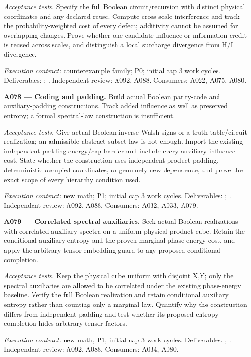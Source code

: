 \documentclass[11pt]{article}
\begin{document}
\emph{Acceptance tests.} Specify the full Boolean circuit/recursion with distinct physical coordinates and any declared reuse. Compute cross-scale interference and track the probability-weighted cost of every defect; additivity cannot be assumed for overlapping changes. Prove whether one candidate influence or information credit is reused across scales, and distinguish a local surcharge divergence from H/I divergence.

{\small\emph{Execution contract:} counterexample family; P0; initial cap 3 work cycles. Deliverables: ; . Independent review: A092, A088. Consumers: A022, A075, A080.}

\textbf{A078 --- Coding and padding.} Build actual Boolean parity-code and auxiliary-padding constructions. Track added influence as well as preserved entropy; a formal spectral-law construction is insufficient.

\emph{Acceptance tests.} Give actual Boolean inverse Walsh signs or a truth-table/circuit realization; an admissible abstract subset law is not enough. Import the existing independent-padding energy/cap barrier and include every auxiliary influence cost. State whether the construction uses independent product padding, deterministic occupied coordinates, or genuinely new dependence, and prove the exact scope of every hierarchy condition used.

{\small\emph{Execution contract:} new math; P1; initial cap 3 work cycles. Deliverables: ; . Independent review: A092, A088. Consumers: A032, A033, A079.}

\textbf{A079 --- Correlated spectral auxiliaries.} Seek actual Boolean realizations with correlated auxiliary spectra on a uniform physical product cube. Retain the conditional auxiliary entropy and the proven marginal phase-energy cost, and apply the arbitrary-tensor embedding guard to any proposed conditional completion.

\emph{Acceptance tests.} Keep the physical cube uniform with disjoint X,Y; only the spectral auxiliaries are allowed to be correlated under the existing phase-energy baseline. Verify the full Boolean realization and retain conditional auxiliary entropy rather than counting only a marginal law. Quantify why the construction differs from independent padding and test whether its proposed entropy completion hides arbitrary tensor factors.

{\small\emph{Execution contract:} new math; P1; initial cap 3 work cycles. Deliverables: ; . Independent review: A092, A088. Consumers: A034, A080.}
\end{document}

